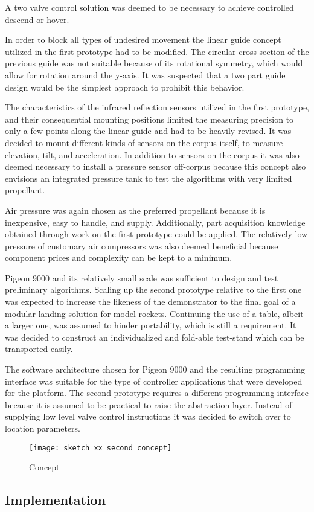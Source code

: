 A two valve control solution was deemed to be necessary to achieve controlled descend or hover. 

In order to block all types of undesired movement the linear guide concept utilized in the first prototype had to be modified. The circular cross-section of the previous guide was not suitable because of its rotational symmetry, which would allow for rotation around the y-axis. It was suspected that a two part guide design would be the simplest approach to prohibit this behavior.

The characteristics of the infrared reflection sensors utilized in the first prototype, and their consequential mounting positions  limited the measuring precision to only a few points along the linear guide and had to be heavily revised. It was decided to mount different kinds of sensors on the corpus itself, to measure elevation, tilt, and acceleration. In addition to sensors on the corpus it was also deemed necessary to install a pressure sensor off-corpus because this concept also envisions an integrated pressure tank to test the algorithms with very limited propellant.

Air pressure was again chosen as the preferred propellant because it is inexpensive, easy to handle, and supply. Additionally, part acquisition knowledge obtained through work on the first prototype could be applied. The relatively low pressure of customary air compressors was also deemed beneficial because component prices and complexity can be kept to a minimum.

Pigeon 9000 and its relatively small scale was sufficient to design and test preliminary algorithms. Scaling up the second prototype relative to the first one was expected to increase the likeness of the demonstrator to the final goal of a modular landing solution for model rockets. Continuing the use of a table, albeit a larger one, was assumed to hinder portability, which is still a requirement. It was decided to construct an individualized and fold-able test-stand which can be transported easily.

The software architecture chosen for Pigeon 9000 and the resulting programming interface was suitable for the type of controller applications that were developed for the platform. The second prototype requires a different programming interface because it is assumed to be practical to raise the abstraction layer. Instead of supplying low level valve control instructions it was decided to switch over to location parameters.

\begin{figure}[h]
\centering

\texttt{[image: sketch\_xx\_second\_concept]}

\caption{Concept}
\end{figure}

\subsection{Implementation}


